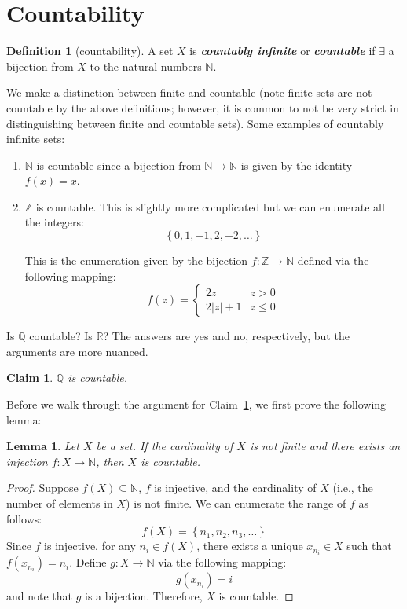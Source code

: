 \documentclass{article}
\newcommand{\R}{\mathbb{R}}
\newcommand{\N}{\mathbb{N}}
\newcommand{\Q}{\mathbb{Q}}
\newcommand{\Z}{\mathbb{Z}}
\newcommand{\keyword}[1]{\textit{\textbf{#1}}\index{#1}}
\newtheorem{lemma}{Lemma}
\newtheorem{claim}{Claim}
\theoremstyle{definition}
\newtheorem{definition}{Definition}
\begin{document}
\section{Countability}
\begin{definition}[countability]\label{def:lecture1_countable}
  A set $X$ is \keyword{countably infinite} or \keyword{countable} if $\exists$ a bijection from $X$ to the natural numbers $\N$.
\end{definition}
We make a distinction between finite and countable (note finite sets are not countable by the above definitions; however, it is common to not be very strict in distinguishing between finite and countable sets). Some examples of countably infinite sets:
\begin{enumerate}
  \item $\mathbb{N}$ is countable since a bijection from $\mathbb{N} \to \mathbb{N}$ is given by the identity $f(x) = x$.

  \item $\mathbb{Z}$ is countable. This is slightly more complicated but we can enumerate all the integers:
    \[
      \left\{0, 1, -1, 2, -2, \ldots\right\}
    \]

    This is the enumeration given by the bijection $f:\Z \to \N$ defined via the following mapping: 
    \begin{equation*}
        f(z) = \begin{cases}
            2z & z > 0 \\
            2|z| + 1 & z \leq 0
        \end{cases}
    \end{equation*}
\end{enumerate}

Is $\Q$ countable? Is $\R$? The answers are yes and no, respectively, but the arguments are more nuanced.

\begin{claim}\label{claim:Q_countable}
  $\Q$ is countable.
\end{claim}
Before we walk through the argument for Claim~\ref{claim:Q_countable}, we first prove the following lemma:
\begin{lemma}\label{lem:injection_countable}
    Let $X$ be a set. If the cardinality of $X$ is not finite and there exists an injection $f:X \to \N$, then $X$ is countable. 
\end{lemma}
\begin{proof}
    Suppose $f(X) \subseteq \N$, $f$ is injective, and the cardinality of $X$ (i.e., the number of elements in $X$) is not finite. We can enumerate the range of $f$ as follows:
    \begin{equation*}
        f(X) = \left\{ n_1, n_2, n_3, \hdots \right\}
    \end{equation*}
    Since $f$ is injective, for any $n_i \in f(X)$, there exists a unique $x_{n_i} \in X$ such that $f(x_{n_i}) = n_i$. Define $g:X\to \N$ via the following mapping:
    \begin{equation*}
        g(x_{n_i}) = i
    \end{equation*}
    and note that $g$ is a bijection. Therefore, $X$ is countable. 
\end{proof}
\end{document}
